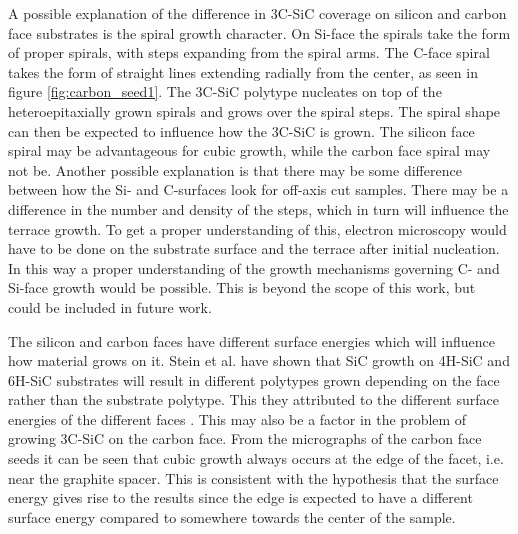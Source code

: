 A possible explanation of the difference in 3C-SiC coverage on silicon and carbon face substrates is the spiral growth character. On Si-face the spirals take the form of proper spirals, with steps expanding from the spiral arms. The C-face spiral takes the form of straight lines extending radially from the center, as seen in figure \ref{fig:carbon_seed1}. The 3C-SiC polytype nucleates on top of the heteroepitaxially grown spirals and grows over the spiral steps. The spiral shape can then be expected to influence how the 3C-SiC is grown. The silicon face spiral may be advantageous for cubic growth, while the carbon face spiral may not be. Another possible explanation is that there may be some difference between how the Si- and C-surfaces look for off-axis cut samples. There may be a difference in the number and density of the steps, which in turn will influence the terrace growth. To get a proper understanding of this, electron microscopy would have to be done on the substrate surface and the terrace after initial nucleation. In this way a proper understanding of the growth mechanisms governing C- and Si-face growth would be possible. This is beyond the scope of this work, but could be included in future work. 

The silicon and carbon faces have different surface energies which will influence how material grows on it. Stein et al. have shown that SiC growth on 4H-SiC and 6H-SiC substrates will result in different polytypes grown depending on the face rather than the substrate polytype. This they attributed to the different surface energies of the different faces \cite{Stein1992}. This may also be a factor in the problem of growing 3C-SiC on the carbon face. From the micrographs of the carbon face seeds it can be seen that cubic growth always occurs at the edge of the facet, i.e. near the graphite spacer. This is consistent with the hypothesis that the surface energy gives rise to the results since the edge is expected to have a different surface energy compared to somewhere towards the center of the sample. 



